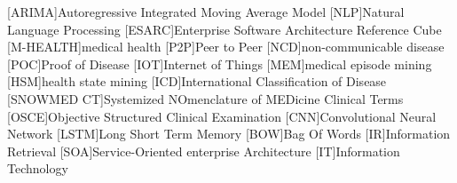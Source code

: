 \begin{acronym}[SNOWMED CT]
[ARIMA]{Autoregressive Integrated Moving Average Model}
[NLP]{Natural Language Processing}
[ESARC]{Enterprise Software Architecture Reference Cube}
[M-HEALTH]{medical health}
[P2P]{Peer to Peer}
[NCD]{non-communicable disease}
[POC]{Proof of Disease}
[IOT]{Internet of Things}
[MEM]{medical episode mining}
[HSM]{health state mining}
[ICD]{International Classification of Disease}
[SNOWMED CT]{Systemized NOmenclature of MEDicine Clinical Terms}
[OSCE]{Objective Structured Clinical Examination}
[CNN]{Convolutional Neural Network}
[LSTM]{Long Short Term Memory}
[BOW]{Bag Of Words}
[IR]{Information Retrieval}
[SOA]{Service-Oriented enterprise Architecture}
[IT]{Information Technology}
\end{acronym}